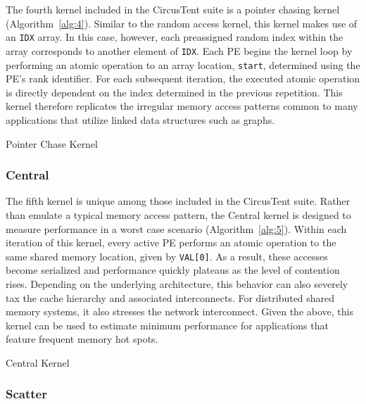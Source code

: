 The fourth kernel included in the CircusTent suite is a pointer chasing kernel (Algorithm~\ref{alg:4}).
Similar to the random access kernel, this kernel makes use of an \texttt{IDX} array.
In this case, however, each preassigned random index within the array corresponds to another element of \texttt{IDX}.
Each PE begins the kernel loop by performing an atomic operation to an array location, \texttt{start}, determined using the PE's rank identifier.
For each subsequent iteration, the executed atomic operation is directly dependent on the index determined in the previous repetition.
This kernel therefore replicates the irregular memory access patterns common to many applications that utilize linked data structures such as graphs.

\begin{algorithm}
\SetAlgoLined
{}
\caption{Pointer Chase Kernel}
\label{alg:4}
\end{algorithm}

\subsubsection{Central}
\label{subsubsec:central}

The fifth kernel is unique among those included in the CircusTent suite.
Rather than emulate a typical memory access pattern, the Central kernel is designed to measure performance in a worst case scenario (Algorithm~\ref{alg:5}).
Within each iteration of this kernel, every active PE performs an atomic operation to the same shared memory location, given by \texttt{VAL[0]}.
As a result, these accesses become serialized and performance quickly plateaus as the level of contention rises.
Depending on the underlying architecture, this behavior can also severely tax the cache hierarchy and associated interconnects.
For distributed shared memory systems, it also stresses the network interconnect.
Given the above, this kernel can be used to estimate minimum performance for applications that feature frequent memory hot spots.

\begin{algorithm}
\SetAlgoLined
{}
\caption{Central Kernel}
\label{alg:5}
\end{algorithm}

\subsubsection{Scatter}
\label{subsubsec:scatter}

